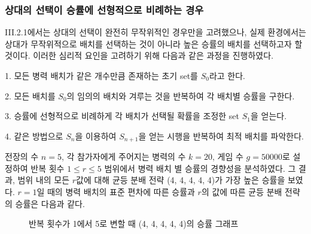\subsubsection{상대의 선택이 승률에 선형적으로 비례하는 경우}
III.2.1에서는 상대의 선택이 완전히 무작위적인 경우만을 고려했으나, 실제 환경에서는 상대가 무작위적으로 배치를 선택하는 것이 아니라 높은 승률의 배치를 선택하고자 할 것이다. 이러한 심리적 요인을 고려하기 위해 다음과 같은 과정을 진행하였다. 

1. 모든 병력 배치가 같은 개수만큼 존재하는 초기 set를 $S_0$라고 한다.

2. 모든 배치를 $S_0$의 임의의 배치와 겨루는 것을 반복하여 각 배치별 승률을 구한다.

3. 승률에 선형적으로 비례하게 각 배치가 선택될 확률을 조정한 set $S_1$을 얻는다. 

4. 같은 방법으로 $S_n$을 이용하여 $S_{n+1}$을 얻는 시행을 반복하여 최적 배치를 파악한다.

전장의 수 $n=5$, 각 참가자에게 주어지는 병력의 수 $k=20$, 게임 수 $g=50000$로 설정하여 반복 횟수 $1 \leq r \leq 5$ 범위에서 병력 배치 별 승률의 경향성을 분석하였다. 그 결과, 범위 내의 모든 $r$값에 대해 균등 분배 전략 (4, 4, 4, 4, 4)가 가장 높은 승률을 보였다. $r=1$일 때의 병력 배치의 표준 편차에 따른 승률과 $r$의 값에 따른 균등 분배 전략의 승률은 다음과 같다.

\begin{figure}[htb!]
    \vspace{1em}
    \centering
    \pgfplotsset{width=0.8\textwidth, height=0.5\textwidth}
    \caption{반복 횟수가 1에서 5로 변할 때 (4, 4, 4, 4, 4)의 승률 그래프}
    \label{fig:enter-label}
\end{figure}

